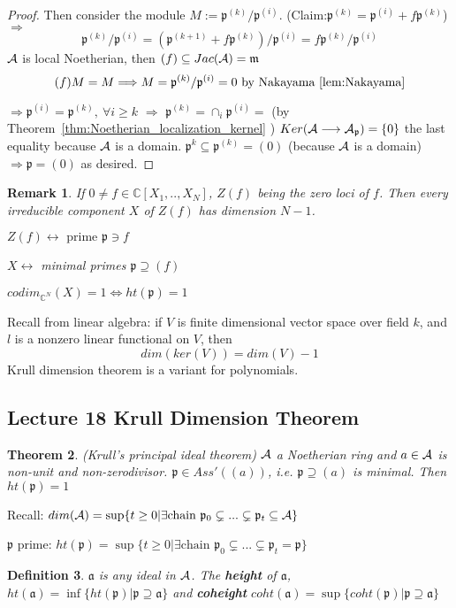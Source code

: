 \documentclass[11pt]{article}
\newtheorem{thm}{Theorem}[section]
\newtheorem{dfn}[thm]{Definition}
\newtheorem{rmk}[thm]{Remark}
\newcommand{\cplx}{\mathbb C}
\newcommand{\sca}{{\mathfrak a}}
\newcommand{\scm}{{\mathfrak m}}
\newcommand{\scp}{{\mathfrak p}}
\newcommand{\cala}{{\cal A}}
\newcommand{\Lrta}{\Longrightarrow}
\newcommand{\lrta}{\longrightarrow}
\newcommand{\llrta}{\longleftrightarrow}
\newcommand{\Llrta}{\Longleftrightarrow}
\begin{document}
\begin{proof}
Then consider the module $M:=\scp^{(k)}/\scp^{(i)}$.
(Claim:$\scp^{(k)}=\scp^{(i)}+f\scp^{(k)}$)$\Lrta$ 
$$
\scp^{(k)}/\scp^{(i)}=(\scp^{(k+1)}+f\scp^{(k)})/\scp^{(i)}=f\scp^{(k)}/\scp^{(i)}
$$
$\cala$ is local Noetherian, then
$(f)\subseteq Jac(\cala)=\scm$
$$
(f)M=M\Lrta M=\scp^{(k)}/\scp^{(i)}=0\text{ by Nakayama~\ref{lem:Nakayama}}
$$

$\Lrta\scp^{(i)}=\scp^{(k)},\ \forall i\geq k$ $\Lrta$ $\scp^{(k)}=\cap_i\scp^{(i)}=$ (by Theorem~\ref{thm:Noetherian_localization_kernel} ) $Ker(\cala\lrta \cala_\scp)=\{0\}$ the last equality because $\cala$ is a domain.
$\scp^k\subseteq\scp^{(k)}=(0)$ (because $\cala$ is a domain) $\Lrta\scp=(0)$ as desired.
\end{proof}

\begin{rmk}
If $0\neq f\in\cplx[X_1,..,X_N]$, $Z(f)$ being the zero loci of $f$. Then every irreducible component $X$ of $Z(f)$ has dimension $N-1$.

$Z(f)\llrta\text{ prime }\scp\ni f$

$X\llrta $ minimal primes $\scp\supseteq (f)$ 

$codim_{\cplx^N}(X)=1\Llrta ht(\scp)=1$
\end{rmk}

Recall from linear algebra:
if $V$ is finite dimensional vector space over field $k$, and $l$ is a nonzero linear functional on $V$, then
$$
dim(ker(V))=dim(V)-1
$$
Krull dimension theorem is a variant for polynomials.

\subsection{Lecture 18 Krull Dimension Theorem}
\begin{thm}\label{thm:krull_principal}
(Krull's principal ideal theorem) $\cala$ a Noetherian ring and $a\in \cala$ is non-unit and non-zerodivisor.
$\scp\in Ass'((a))$, i.e. $\scp\supseteq (a)$ is minimal. Then $ht(\scp)=1$
\end{thm}
Recall: $dim(\cala)=\sup\{t\geq 0|\exists \text{chain } \scp_0\subsetneq...\subsetneq \scp_t\subseteq \cala\}$

$\scp$ prime: $ht(\scp)=\sup\{t\geq 0|\exists \text{chain } \scp_0\subsetneq...\subsetneq \scp_t=\scp\}$
\begin{dfn}$\sca$ is any ideal in $\cala$. The \textbf{height} of $\sca$, $ht(\sca)=\inf\{ht(\scp)|\scp\supseteq\sca\}$
 and \textbf{coheight} $coht(\sca)=\sup\{coht(\scp)|\scp\supseteq \sca\}$
\end{dfn}
\end{document}
